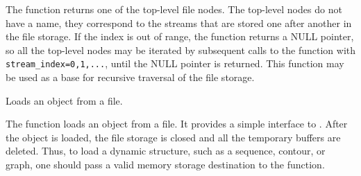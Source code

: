 
\begin{description}
\end{description}

The function returns one of the top-level file
nodes. The top-level nodes do not have a name, they correspond to the
streams that are stored one after another in the file storage. If the
index is out of range, the function returns a NULL pointer, so all the
top-level nodes may be iterated by subsequent calls to the function with
\texttt{stream\_index=0,1,...}, until the NULL pointer is returned. This function
may be used as a base for recursive traversal of the file storage.

\fi

Loads an object from a file.


\begin{description}
\end{description}

The function loads an object from a file. It provides a
simple interface to . After the object is loaded, the file
storage is closed and all the temporary buffers are deleted. Thus,
to load a dynamic structure, such as a sequence, contour, or graph, one
should pass a valid memory storage destination to the function.

\ifC

